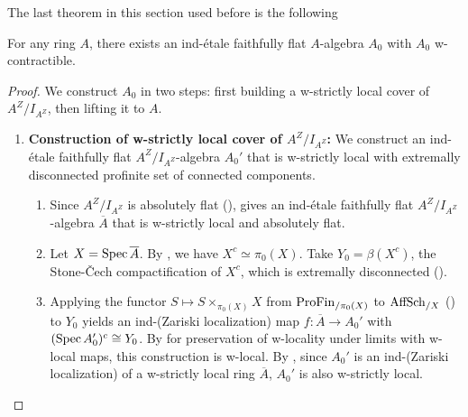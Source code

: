 \begin{lemma}
The last theorem in this section used before \cite[Theorem 5.6.2]{proetale} is the following 

\begin{lemma}
    For any ring $A$, there exists an ind-étale faithfully flat $A$-algebra $A_0$ with $A_0$ w-contractible.
    \label{thm:ind-etale-w-contractible-cover-exists}
\end{lemma}

\begin{proof}
    
    We construct $A_0$ in two steps: first building a w-strictly local cover of $A^Z/I_{A^Z}$, then lifting it to $A$.

    \begin{enumerate}
        \item \textbf{Construction of w-strictly local cover of $A^Z/I_{A^Z}$:} 
        We construct an ind-étale faithfully flat $A^Z/I_{A^Z}$-algebra $A_0'$ that is w-strictly local with extremally disconnected profinite set of connected components.

        \begin{enumerate}
            \item Since $A^Z/I_{A^Z}$ is absolutely flat (),  gives an ind-étale faithfully flat $A^Z/I_{A^Z}$-algebra $\overline{A}$ that is w-strictly local and absolutely flat.

            \item Let $X = \operatorname{Spec} \overline{A}$. By , we have $X^c \simeq \pi_0(X)$. Take $Y_0 = \beta(X^c)$, the Stone-Čech compactification of $X^c$, which is extremally disconnected ().

            \item Applying the functor $S \mapsto S \times_{\pi_0(X)} X$ from $\operatorname{ProFin}_{/\pi_0(X)}$ to $\operatorname{AffSch}_{/X}$ () to $Y_0$ yields an ind-(Zariski localization) map $f: \overline{A} \to A_0'$ with $(\operatorname{Spec} A_0')^c \cong Y_0$. By  for preservation of w-locality under limits with w-local maps, this construction is w-local. By , since $A_0'$ is an ind-(Zariski localization) of a w-strictly local ring $\overline{A}$, $A_0'$ is also w-strictly local.


\end{enumerate}
\end{enumerate}
\end{proof}
\end{lemma}
